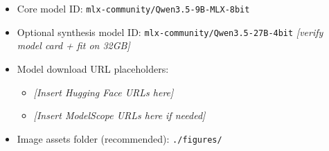 \documentclass[11pt]{article}
\begin{document}
\begin{itemize}
  \item Core model ID: \texttt{mlx-community/Qwen3.5-9B-MLX-8bit} \cite{MLXCommunity_Qwen35_9B_MLX8}
  \item Optional synthesis model ID: \texttt{mlx-community/Qwen3.5-27B-4bit} \textit{[verify model card + fit on 32GB]}
  \item Model download URL placeholders:
    \begin{itemize}
      \item \textit{[Insert Hugging Face URLs here]}
      \item \textit{[Insert ModelScope URLs here if needed]}
    \end{itemize}
  \item Image assets folder (recommended): \texttt{./figures/}
\end{itemize}
\end{document}
